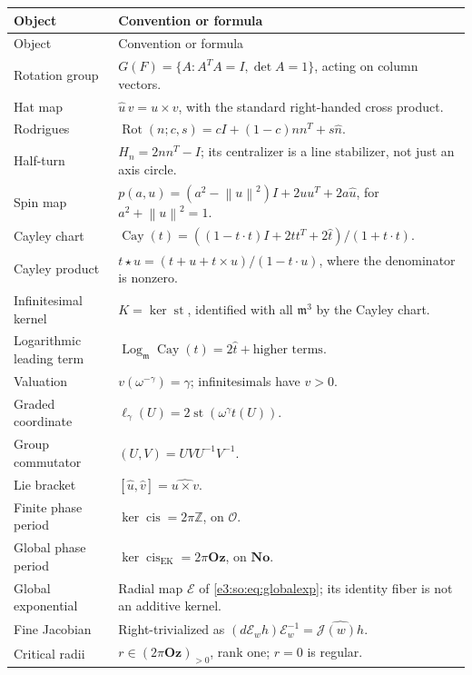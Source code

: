 \documentclass[11pt,letterpaper]{article}
\numberwithin{equation}{section}
\theoremstyle{definition}
\theoremstyle{remark}
\newcommand{\No}{\mathbf{No}}
\newcommand{\Z}{\mathbb Z}
\newcommand{\OO}{\mathcal O}
\newcommand{\mm}{\mathfrak m}
\newcommand{\Oz}{\mathbf{Oz}}
\newcommand{\st}{\operatorname{st}}
\newcommand{\cis}{\operatorname{cis}}
\newcommand{\cay}{\operatorname{Cay}}
\newcommand{\Log}{\operatorname{Log}}
\newcommand{\Rot}{\operatorname{Rot}}
\newcommand{\norm}[1]{\left\lVert#1\right\rVert}
\newcommand{\comm}[2]{\left(#1,#2\right)}
\begin{document}
\renewcommand{\arraystretch}{1.25}
\begin{longtable}{L{0.27\textwidth}L{0.67\textwidth}}
\toprule
Object & Convention or formula\\
\midrule
\endfirsthead
\toprule Object & Convention or formula\\\midrule
\endhead
Rotation group & \(G(F)=\{A:A^TA=I,\det A=1\}\), acting on column vectors.\\
Hat map & \(\widehat u\,v=u\times v\), with the standard right-handed cross product.\\
Rodrigues & \(\Rot(n;c,s)=cI+(1-c)nn^T+s\widehat n\).\\
Half-turn & \(H_n=2nn^T-I\); its centralizer is a line stabilizer, not just an axis circle.\\
Spin map & \(p(a,u)=(a^2-\norm u^2)I+2uu^T+2a\widehat u\), for \(a^2+\norm u^2=1\).\\
Cayley chart & \(\cay(t)=((1-t\cdot t)I+2tt^T+2\widehat t)/(1+t\cdot t)\).\\
Cayley product & \(t\star u=(t+u+t\times u)/(1-t\cdot u)\), where the denominator is nonzero.\\
Infinitesimal kernel & \(K=\ker\st\), identified with all \(\mm^3\) by the Cayley chart.\\
Logarithmic leading term & \(\Log_{\mm}\cay(t)=2\widehat t+\text{higher terms}\).\\
Valuation & \(v(\omega^{-\gamma})=\gamma\); infinitesimals have \(v>0\).\\
Graded coordinate & \(\ell_\gamma(U)=2\st(\omega^\gamma t(U))\).\\
Group commutator & \(\comm{U}{V}=UVU^{-1}V^{-1}\).\\
Lie bracket & \([\widehat u,\widehat v]=\widehat{u\times v}\).\\
Finite phase period & \(\ker\cis=2\pi\Z\), on \(\OO\).\\
Global phase period & \(\ker\cis_{\mathrm{EK}}=2\pi\Oz\), on \(\No\).\\
Global exponential & Radial map \(\mathcal E\) of \cref{e3:so:eq:globalexp}; its identity fiber is not an additive kernel.\\
Fine Jacobian & Right-trivialized as \((d\mathcal E_w h)\mathcal E_w^{-1}=\widehat{\mathcal J(w)h}\).\\
Critical radii & \(r\in(2\pi\Oz)_{>0}\), rank one; \(r=0\) is regular.\\
\bottomrule
\end{longtable}
\renewcommand{\arraystretch}{1}
\end{document}
